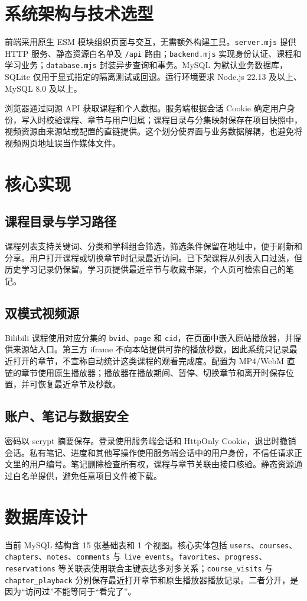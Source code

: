 \documentclass[UTF8,12pt,a4paper]{ctexart}
\begin{document}
\section{系统架构与技术选型}
前端采用原生 ESM 模块组织页面与交互，无需额外构建工具。\texttt{server.mjs} 提供 HTTP 服务、静态资源白名单及 \texttt{/api} 路由；\texttt{backend.mjs} 实现身份认证、课程和学习业务；\texttt{database.mjs} 封装异步查询和事务。MySQL 为默认业务数据库，SQLite 仅用于显式指定的隔离测试或回退。运行环境要求 Node.js 22.13 及以上、MySQL 8.0 及以上。

浏览器通过同源 API 获取课程和个人数据。服务端根据会话 Cookie 确定用户身份，写入时校验课程、章节与用户归属；课程目录与分集映射保存在项目快照中，视频资源由来源站或配置的直链提供。这个划分使界面与业务数据解耦，也避免将视频网页地址误当作媒体文件。

\section{核心实现}
\subsection{课程目录与学习路径}
课程列表支持关键词、分类和学科组合筛选，筛选条件保留在地址中，便于刷新和分享。用户打开课程或切换章节时记录最近访问。已下架课程从列表入口过滤，但历史学习记录仍保留。学习页提供最近章节与收藏书架，个人页可检索自己的笔记。

\subsection{双模式视频源}
Bilibili 课程使用对应分集的 \texttt{bvid}、\texttt{page} 和 \texttt{cid}，在页面中嵌入原站播放器，并提供来源站入口。第三方 iframe 不向本站提供可靠的播放秒数，因此系统只记录最近打开的章节，不宣称自动统计这类课程的观看完成度。配置为 MP4/WebM 直链的章节使用原生播放器；播放器在播放期间、暂停、切换章节和离开时保存位置，并可恢复最近章节及秒数。

\subsection{账户、笔记与数据安全}
密码以 scrypt 摘要保存。登录使用服务端会话和 HttpOnly Cookie，退出时撤销会话。私有笔记、进度和其他写操作使用服务端会话中的用户身份，不信任请求正文里的用户编号。笔记删除检查所有权，课程与章节关联由接口核验。静态资源通过白名单提供，避免任意项目文件被下载。

\section{数据库设计}
当前 MySQL 结构含 15 张基础表和 1 个视图。核心实体包括 \texttt{users}、\texttt{courses}、\texttt{chapters}、\texttt{notes}、\texttt{comments} 与 \texttt{live\_events}。\texttt{favorites}、\texttt{progress}、\texttt{reservations} 等关联表使用联合主键表达多对多关系；\texttt{course\_visits} 与 \texttt{chapter\_playback} 分别保存最近打开章节和原生播放器播放记录。二者分开，是因为“访问过”不能等同于“看完了”。
\end{document}
